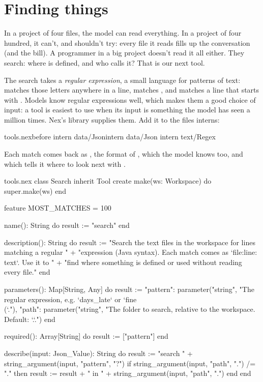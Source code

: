 \chapter{Finding things}\label{ch:search}

In a project of four files, the model can read everything. In a project of
four hundred, it can't, and shouldn't try: every file it reads fills up
the conversation (and the bill). A programmer in a big project doesn't
read it all either. They search: where is  defined, and
who calls it? That is our next tool.

The search takes a \emph{regular expression}, a small language for
patterns of text:  matches those letters anywhere in a
line,  matches , and
 matches a line that starts with
. Models know regular expressions well, which makes them a
good choice of input: a tool is easiest to use when its input is
something the model has seen a million times. Nex's 
library supplies them. Add it to the files  interns:

\begin{tightaddbefore}{tools.nex}{before intern data/Json}{intern data/Json}
intern text/Regex
\end{tightaddbefore}

Each match comes back as , the format of
, which the model knows too, and which tells it where to look
next with .

\begin{append}{tools.nex}
class Search inherit Tool
create
  make(ws: Workspace) do
    super.make(ws)
  end

feature
  MOST_MATCHES = 100

  name(): String do
    result := "search"
  end

  description(): String do
    result := "Search the text files in the workspace for lines matching a regular "
      + "expression (Java syntax). Each match comes as `file:line: text`. Use it to "
      + "find where something is defined or used without reading every file."
  end

  parameters(): Map[String, Any] do
    result := {"pattern": parameter("string", "The regular expression, e.g. `days_late` or `fine\\(`."),
      "path": parameter("string", "The folder to search, relative to the workspace. Default: `.`.")}
  end

  required(): Array[String] do
    result := ["pattern"]
  end

  describe(input: Json_Value): String do
    result := "search " + string_argument(input, "pattern", "?")
    if string_argument(input, "path", ".") /= "." then
      result := result + " in " + string_argument(input, "path", ".")
    end
  end
\end{append}

